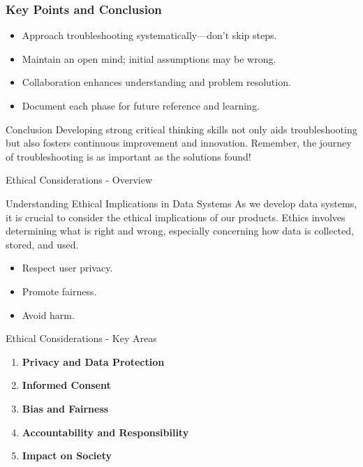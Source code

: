 \documentclass[aspectratio=169]{beamer}
\begin{document}
\begin{frame}[fragile]
    \frametitle{Key Points and Conclusion}
    \begin{itemize}
        \item Approach troubleshooting systematically—don’t skip steps.
        \item Maintain an open mind; initial assumptions may be wrong.
        \item Collaboration enhances understanding and problem resolution.
        \item Document each phase for future reference and learning.
    \end{itemize}
    
    \begin{block}{Conclusion}
        Developing strong critical thinking skills not only aids troubleshooting but also fosters continuous improvement and innovation. Remember, the journey of troubleshooting is as important as the solutions found!
    \end{block}
\end{frame}

\begin{frame}[fragile]{Ethical Considerations - Overview}
  \begin{block}{Understanding Ethical Implications in Data Systems}
    As we develop data systems, it is crucial to consider the ethical implications of our products. Ethics involves determining what is right and wrong, especially concerning how data is collected, stored, and used.
  \end{block}
  \begin{itemize}
    \item Respect user privacy.
    \item Promote fairness.
    \item Avoid harm.
  \end{itemize}
\end{frame}

\begin{frame}[fragile]{Ethical Considerations - Key Areas}
  \begin{enumerate}
    \item \textbf{Privacy and Data Protection}
    \item \textbf{Informed Consent}
    \item \textbf{Bias and Fairness}
    \item \textbf{Accountability and Responsibility}
    \item \textbf{Impact on Society}
  \end{enumerate}
\end{frame}
\end{document}
